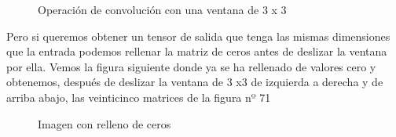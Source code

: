 \documentclass[
  a4paper,
  DIV=11,
  numbers=noendperiod]{scrreprt}
\begin{document}
\begin{figure}


\caption{\label{fig-sin-padding}Operación de convolución con una ventana
de 3 x 3}

\end{figure}%

Pero si queremos obtener un tensor de salida que tenga las mismas
dimensiones que la entrada podemos rellenar la matriz de ceros antes de
deslizar la ventana por ella. Vemos la figura siguiente donde ya se ha
rellenado de valores cero y obtenemos, después de deslizar la ventana de
3 x3 de izquierda a derecha y de arriba abajo, las veinticinco matrices
de la figura nº 71

\begin{figure}


\caption{\label{fig-relleno-ceros}Imagen con relleno de ceros}

\end{figure}%
\end{document}
